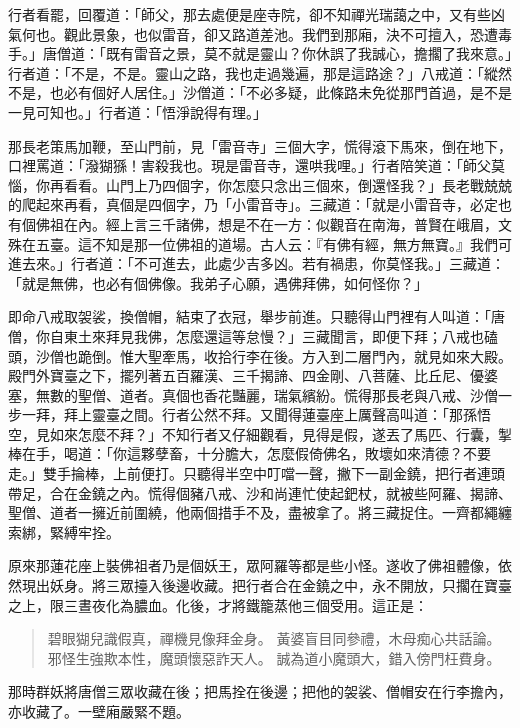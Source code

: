 行者看罷，回覆道：「師父，那去處便是座寺院，卻不知禪光瑞藹之中，又有些凶氣何也。觀此景象，也似雷音，卻又路道差池。我們到那廂，決不可擅入，恐遭毒手。」唐僧道：「既有雷音之景，莫不就是靈山？你休誤了我誠心，擔擱了我來意。」行者道：「不是，不是。靈山之路，我也走過幾遍，那是這路途？」八戒道：「縱然不是，也必有個好人居住。」沙僧道：「不必多疑，此條路未免從那門首過，是不是一見可知也。」行者道：「悟淨說得有理。」

那長老策馬加鞭，至山門前，見「雷音寺」三個大字，慌得滾下馬來，倒在地下，口裡罵道：「潑猢猻！害殺我也。現是雷音寺，還哄我哩。」行者陪笑道：「師父莫惱，你再看看。山門上乃四個字，你怎麼只念出三個來，倒還怪我？」長老戰兢兢的爬起來再看，真個是四個字，乃「小雷音寺」。三藏道：「就是小雷音寺，必定也有個佛祖在內。經上言三千諸佛，想是不在一方：似觀音在南海，普賢在峨眉，文殊在五臺。這不知是那一位佛祖的道場。古人云：『有佛有經，無方無寶。』我們可進去來。」行者道：「不可進去，此處少吉多凶。若有禍患，你莫怪我。」三藏道：「就是無佛，也必有個佛像。我弟子心願，遇佛拜佛，如何怪你？」

即命八戒取袈裟，換僧帽，結束了衣冠，舉步前進。只聽得山門裡有人叫道：「唐僧，你自東土來拜見我佛，怎麼還這等怠慢？」三藏聞言，即便下拜；八戒也磕頭，沙僧也跪倒。惟大聖牽馬，收拾行李在後。方入到二層門內，就見如來大殿。殿門外寶臺之下，擺列著五百羅漢、三千揭諦、四金剛、八菩薩、比丘尼、優婆塞，無數的聖僧、道者。真個也香花豔麗，瑞氣繽紛。慌得那長老與八戒、沙僧一步一拜，拜上靈臺之間。行者公然不拜。又聞得蓮臺座上厲聲高叫道：「那孫悟空，見如來怎麼不拜？」不知行者又仔細觀看，見得是假，遂丟了馬匹、行囊，掣棒在手，喝道：「你這夥孽畜，十分膽大，怎麼假倚佛名，敗壞如來清德？不要走。」雙手掄棒，上前便打。只聽得半空中叮噹一聲，撇下一副金鐃，把行者連頭帶足，合在金鐃之內。慌得個豬八戒、沙和尚連忙使起鈀杖，就被些阿羅、揭諦、聖僧、道者一擁近前圍繞，他兩個措手不及，盡被拿了。將三藏捉住。一齊都繩纏索綁，緊縛牢拴。

原來那蓮花座上裝佛祖者乃是個妖王，眾阿羅等都是些小怪。遂收了佛祖體像，依然現出妖身。將三眾擡入後邊收藏。把行者合在金鐃之中，永不開放，只擱在寶臺之上，限三晝夜化為膿血。化後，才將鐵籠蒸他三個受用。這正是：
\begin{quote}
碧眼猢兒識假真，禪機見像拜金身。
黃婆盲目同參禮，木母痴心共話論。
邪怪生強欺本性，魔頭懷惡詐天人。
誠為道小魔頭大，錯入傍門枉費身。
\end{quote}

那時群妖將唐僧三眾收藏在後；把馬拴在後邊；把他的袈裟、僧帽安在行李擔內，亦收藏了。一壁廂嚴緊不題。

